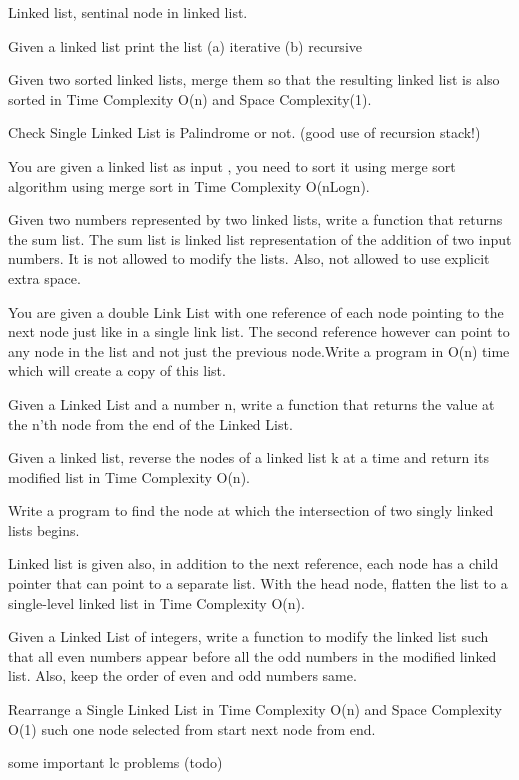 {\begin{exercise}
\newpage
{}
\begin{compactenum}
    \item Linked list, sentinal node in linked list.
    \item Given a linked list print the list (a) iterative (b) recursive
    \item Given two sorted linked lists, merge them so that the resulting linked list is also sorted in Time Complexity O(n) and Space Complexity(1).
    \item Check Single Linked List is Palindrome or not. (good use of recursion stack!)
    \item You are given a linked list as input , you need to sort it using merge sort algorithm using merge sort in Time Complexity O(nLogn).
    \item Given two numbers represented by two linked lists, write a function that returns the sum list. The sum list is linked list representation of the addition of two input numbers. It is not allowed to modify the lists. Also, not allowed to use explicit extra space.
    \item You are given a double Link List with one reference of each node pointing to the next node just like in a single link list. The second reference however can point to any node in the list and not just the previous node.Write a program in O(n) time which will create a copy of this list.
    \item Given a Linked List and a number n, write a function that returns the value at the n'th node from the end of the Linked List.
    \item Given a linked list, reverse the nodes of a linked list k at a time and return its modified list in Time Complexity O(n).
    \item Write a program to find the node at which the intersection of two singly linked lists begins.
    \item Linked list is given also, in addition to the next reference, each node has a child pointer that can point to a separate list. With the head node, flatten the list to a single-level linked list in Time Complexity O(n).
    \item Given a Linked List of integers, write a function to modify the linked list such that all even numbers appear before all the odd numbers in the modified linked list. Also, keep the order of even and odd numbers same.
    \item Rearrange a Single Linked List in Time Complexity O(n) and Space Complexity O(1) such one node selected from start next node from end.
    \item some important lc problems (todo)
\end{compactenum}


\end{exercise}}
